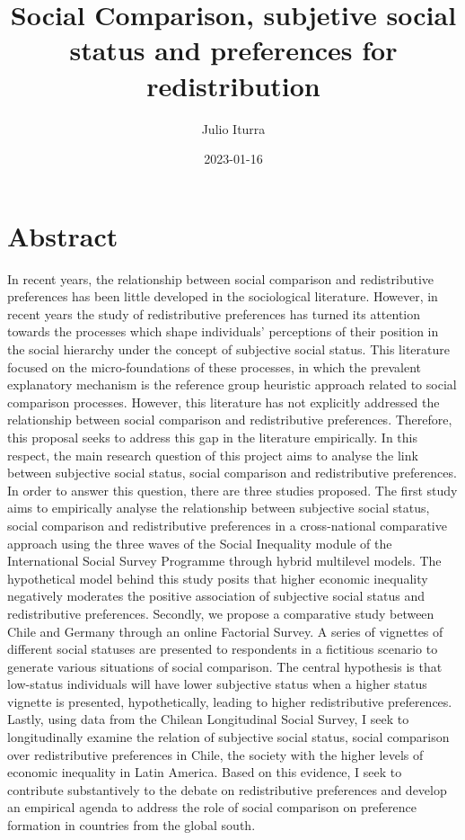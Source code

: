 \documentclass[
  12pt,
]{book}
\title{Social Comparison, subjetive social status and preferences for redistribution}
\author{Julio Iturra}
\date{2023-01-16}
\begin{document}
\maketitle

\listoftables
\listoffigures
{}
\hypertarget{abstract}{%
\chapter*{Abstract}\label{abstract}}

In recent years, the relationship between social comparison and redistributive preferences has been little developed in the sociological literature. However, in recent years the study of redistributive preferences has turned its attention towards the processes which shape individuals' perceptions of their position in the social hierarchy under the concept of subjective social status. This literature focused on the micro-foundations of these processes, in which the prevalent explanatory mechanism is the reference group heuristic approach related to social comparison processes. However, this literature has not explicitly addressed the relationship between social comparison and redistributive preferences. Therefore, this proposal seeks to address this gap in the literature empirically. In this respect, the main research question of this project aims to analyse the link between subjective social status, social comparison and redistributive preferences. In order to answer this question, there are three studies proposed. The first study aims to empirically analyse the relationship between subjective social status, social comparison and redistributive preferences in a cross-national comparative approach using the three waves of the Social Inequality module of the International Social Survey Programme through hybrid multilevel models. The hypothetical model behind this study posits that higher economic inequality negatively moderates the positive association of subjective social status and redistributive preferences. Secondly, we propose a comparative study between Chile and Germany through an online Factorial Survey. A series of vignettes of different social statuses are presented to respondents in a fictitious scenario to generate various situations of social comparison. The central hypothesis is that low-status individuals will have lower subjective status when a higher status vignette is presented, hypothetically, leading to higher redistributive preferences. Lastly, using data from the Chilean Longitudinal Social Survey, I seek to longitudinally examine the relation of subjective social status, social comparison over redistributive preferences in Chile, the society with the higher levels of economic inequality in Latin America. Based on this evidence, I seek to contribute substantively to the debate on redistributive preferences and develop an empirical agenda to address the role of social comparison on preference formation in countries from the global south.
\end{document}
